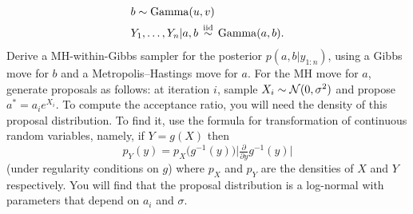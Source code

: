 \documentclass[12pt]{article}
\begin{document}
\begin{enumerate}
\begin{align*}
            & b \sim \operatorname*{Gamma}(u,v) \\
            & Y_1,\ldots,Y_n|a,b \,\stackrel{\mathrm{iid}}{\sim}\,\operatorname*{Gamma}(a,b).
        \end{align*}
        Derive a MH-within-Gibbs sampler for the posterior $p(a,b|y_{1:n})$, using a Gibbs move for $b$ and
        a Metropolis--Hastings move for $a$. For the MH move for $a$, generate proposals as follows:
        at iteration $i$, sample $X_i\sim\mathcal{N}(0,\sigma^2)$ 
        and propose $a^* = a_i e^{X_i}$. To compute the acceptance ratio, you will need the density of this proposal distribution.  
        To find it, use the formula for transformation of continuous random variables, namely, if $Y = g(X)$ then 
        $$ p_Y(y) = p_X\big(g^{-1}(y)\big) \big\vert \tfrac{\partial}{\partial y} g^{-1}(y) \big\vert $$
        (under regularity conditions on $g$) where $p_X$ and $p_Y$ are the densities of $X$ and $Y$ respectively.
        You will find that the proposal distribution is a log-normal with parameters that depend on $a_i$ and $\sigma$.
\end{enumerate}
\end{document}
